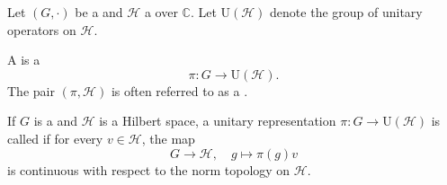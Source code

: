 \begin{definition} \label{definition:unitary_representation_of_a_group_on_a_hilbert_space}

    Let $(G, \cdot)$ be a  and $\mathcal{H}$ a  over $\mathbb{C}$. Let $\mathrm{U}(\mathcal{H})$ denote the group of unitary operators on $\mathcal{H}$.

    A  is a 
    $$\pi : G \to \mathrm{U}(\mathcal{H}).$$
    The pair $(\pi, \mathcal{H})$ is often referred to as a .

    If $G$ is a  and $\mathcal{H}$ is a Hilbert space, a unitary representation $\pi : G \to \mathrm{U}(\mathcal{H})$ is called  if for every $v \in \mathcal{H}$, the map
    $$G \to \mathcal{H}, \quad g \mapsto \pi(g)v$$
    is continuous with respect to the norm topology on $\mathcal{H}$.
\end{definition}
